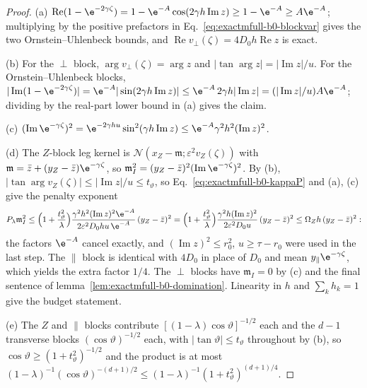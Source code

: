 \begin{proof}
(a) \(\operatorname{Re}(1-\e^{-2\gamma\zeta})
=1-\e^{-A}\cos(2\gamma h\operatorname{Im}z)\ge1-\e^{-A}\ge A\e^{-A}\);
multiplying by the positive prefactors in
Eq.~\eqref{eq:exactmfull-b0-blockvar} gives the two
Ornstein--Uhlenbeck bounds, and
\(\operatorname{Re}v_\perp(\zeta)=4D_0h\operatorname{Re}z\) is exact.

(b) For the \(\perp\) block, \(\arg v_\perp(\zeta)=\arg z\) and
\(|\tan\arg z|=|\operatorname{Im}z|/u\).  For the Ornstein--Uhlenbeck
blocks,
\(|\operatorname{Im}(1-\e^{-2\gamma\zeta})|
=\e^{-A}|\sin(2\gamma h\operatorname{Im}z)|
\le\e^{-A}\,2\gamma h|\operatorname{Im}z|
=(|\operatorname{Im}z|/u)A\e^{-A}\); dividing by the real-part lower bound
in (a) gives the claim.

(c) \((\operatorname{Im}\e^{-\gamma\zeta})^2
=\e^{-2\gamma hu}\sin^2(\gamma h\operatorname{Im}z)
\le\e^{-A}\gamma^2h^2(\operatorname{Im}z)^2\).

(d) The \(Z\)-block leg kernel is
\(\mathcal N(x_Z-\mathfrak m;\varepsilon^2v_Z(\zeta))\) with
\(\mathfrak m=\bar z+(y_Z-\bar z)\e^{-\gamma\zeta}\), so
\(\mathfrak m_I^2=(y_Z-\bar z)^2(\operatorname{Im}\e^{-\gamma\zeta})^2\).
By (b), \(|\tan\arg v_Z(\zeta)|\le|\operatorname{Im}z|/u\le t_\vartheta\),
so Eq.~\eqref{eq:exactmfull-b0-kappaP} and (a), (c) give the penalty
exponent
\begin{equation*}
 P_\lambda\mathfrak m_I^2
 \le\Bigl(1+\frac{t_\vartheta^2}{\lambda}\Bigr)
 \frac{\gamma^2h^2(\operatorname{Im}z)^2\e^{-A}}
      {2\varepsilon^2D_0hu\,\e^{-A}}\,(y_Z-\bar z)^2
 =\Bigl(1+\frac{t_\vartheta^2}{\lambda}\Bigr)
 \frac{\gamma^2h(\operatorname{Im}z)^2}{2\varepsilon^2D_0u}\,
 (y_Z-\bar z)^2
 \le\Omega_Zh\,(y_Z-\bar z)^2:
\end{equation*}
the factors \(\e^{-A}\) cancel exactly, and
\((\operatorname{Im}z)^2\le r_0^2\), \(u\ge\tau-r_0\) were used in the last
step.  The \(\parallel\) block is identical with \(4D_0\) in place of
\(D_0\) and mean \(y_\parallel\e^{-\gamma\zeta}\), which yields the extra
factor \(1/4\).  The \(\perp\) blocks have \(\mathfrak m_I=0\) by (c) and
the final sentence of lemma~\ref{lem:exactmfull-b0-domination}.  Linearity
in \(h\) and \(\sum_kh_k=1\) give the budget statement.

(e) The \(Z\) and \(\parallel\) blocks contribute
\([(1-\lambda)\cos\vartheta]^{-1/2}\) each and the \(d-1\) transverse
blocks \((\cos\vartheta)^{-1/2}\) each, with
\(|\tan\vartheta|\le t_\vartheta\) throughout by (b), so
\(\cos\vartheta\ge(1+t_\vartheta^2)^{-1/2}\) and the product is at most
\((1-\lambda)^{-1}(\cos\vartheta)^{-(d+1)/2}
\le(1-\lambda)^{-1}(1+t_\vartheta^2)^{(d+1)/4}\).
\end{proof}

